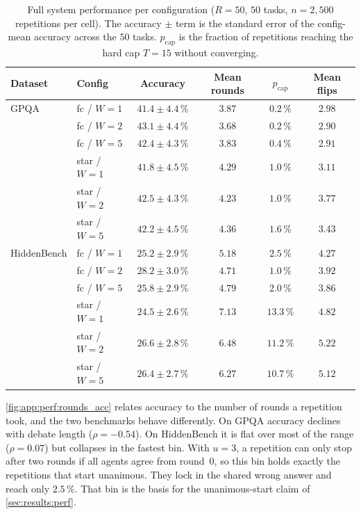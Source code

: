 \begin{table}[H]
\centering
\small
\begin{tabular}{llcccc}
\toprule
Dataset & Config & Accuracy & Mean rounds & $p_{\mathrm{cap}}$ & Mean flips \\
\midrule
GPQA & fc / $W=1$ & $41.4 \pm 4.4\,\%$ & $3.87$ & $0.2\,\%$ & $2.98$ \\
     & fc / $W=2$ & $43.1 \pm 4.4\,\%$ & $3.68$ & $0.2\,\%$ & $2.90$ \\
     & fc / $W=5$ & $42.4 \pm 4.3\,\%$ & $3.83$ & $0.4\,\%$ & $2.91$ \\
     & star / $W=1$ & $41.8 \pm 4.5\,\%$ & $4.29$ & $1.0\,\%$ & $3.11$ \\
     & star / $W=2$ & $42.5 \pm 4.3\,\%$ & $4.23$ & $1.0\,\%$ & $3.77$ \\
     & star / $W=5$ & $42.2 \pm 4.5\,\%$ & $4.36$ & $1.6\,\%$ & $3.43$ \\
\addlinespace
HiddenBench & fc / $W=1$ & $25.2 \pm 2.9\,\%$ & $5.18$ & $2.5\,\%$ & $4.27$ \\
            & fc / $W=2$ & $28.2 \pm 3.0\,\%$ & $4.71$ & $1.0\,\%$ & $3.92$ \\
            & fc / $W=5$ & $25.8 \pm 2.9\,\%$ & $4.79$ & $2.0\,\%$ & $3.86$ \\
            & star / $W=1$ & $24.5 \pm 2.6\,\%$ & $7.13$ & $13.3\,\%$ & $4.82$ \\
            & star / $W=2$ & $26.6 \pm 2.8\,\%$ & $6.48$ & $11.2\,\%$ & $5.22$ \\
            & star / $W=5$ & $26.4 \pm 2.7\,\%$ & $6.27$ & $10.7\,\%$ & $5.12$ \\
\bottomrule
\end{tabular}
\caption[Accuracy and efficiency by configuration]{Full system performance per
         configuration ($R = 50$, $50$ tasks, $n = 2{,}500$ repetitions per cell).
         The accuracy $\pm$ term is the standard error of the config-mean accuracy
         across the $50$ tasks. $p_{\mathrm{cap}}$ is the fraction of repetitions
         reaching the hard cap $T = 15$ without converging.}
\label{tab:app:perf:configs}
\end{table}

\autoref{fig:app:perf:rounds_acc} relates accuracy to the number of rounds a
repetition took, and the two benchmarks behave differently. On GPQA accuracy
declines with debate length ($\rho = -0.54$). On HiddenBench it is flat over most
of the range ($\rho = 0.07$) but collapses in the fastest bin. With $u = 3$, a
repetition can only stop after two rounds if all agents agree from round~$0$, so
this bin holds exactly the repetitions that start unanimous. They lock in the
shared wrong answer and reach only $2.5\,\%$. That bin is the basis for the
unanimous-start claim of \autoref{sec:results:perf}.

